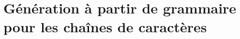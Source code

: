 \section{Génération à partir de grammaire pour les chaînes de caractères}
\label{section:data:strings}
